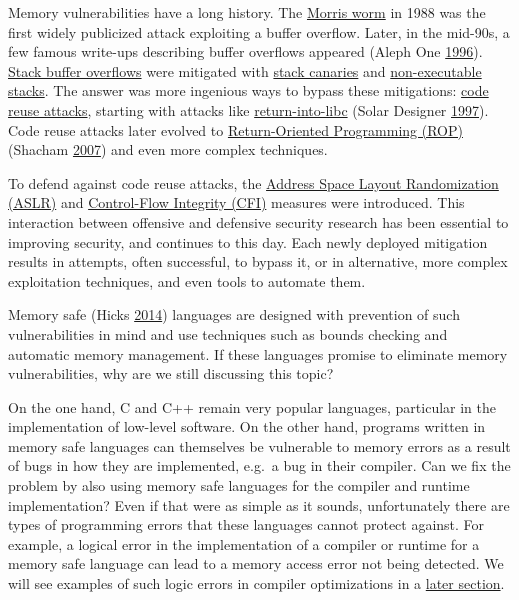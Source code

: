 \documentclass[a4paper,]{report}
\begin{document}
Memory vulnerabilities have a long history. The
\href{https://en.wikipedia.org/wiki/Morris_worm}{Morris worm} in 1988
was the first widely publicized attack exploiting a buffer overflow.
Later, in the mid-90s, a few famous write-ups describing buffer
overflows appeared (Aleph One
\protect\hyperlink{ref-AlephOne1996}{1996}).
\protect\hyperlink{stack-buffer-overflows}{Stack buffer overflows} were
mitigated with \protect\hyperlink{stack-buffer-overflows}{stack
canaries} and \protect\hyperlink{stack-buffer-overflows}{non-executable
stacks}. The answer was more ingenious ways to bypass these mitigations:
\protect\hyperlink{code-reuse-attacks}{code reuse attacks}, starting
with attacks like
\protect\hyperlink{code-reuse-attacks}{return-into-libc} (Solar Designer
\protect\hyperlink{ref-Solar1997}{1997}). Code reuse attacks later
evolved to
\protect\hyperlink{return-oriented-programming}{Return-Oriented
Programming (ROP)} (Shacham \protect\hyperlink{ref-Shacham2007}{2007})
and even more complex techniques.

To defend against code reuse attacks, the
\protect\hyperlink{aslr}{Address Space Layout Randomization (ASLR)} and
\protect\hyperlink{cfi}{Control-Flow Integrity (CFI)} measures were
introduced. This interaction between offensive and defensive security
research has been essential to improving security, and continues to this
day. Each newly deployed mitigation results in attempts, often
successful, to bypass it, or in alternative, more complex exploitation
techniques, and even tools to automate them.

Memory safe (Hicks \protect\hyperlink{ref-Hicks2014}{2014}) languages
are designed with prevention of such vulnerabilities in mind and use
techniques such as bounds checking and automatic memory management. If
these languages promise to eliminate memory vulnerabilities, why are we
still discussing this topic?

On the one hand, C and C++  remain very popular
languages, particular in the implementation of low-level software. On
the other hand, programs written in memory safe languages can themselves
be vulnerable to memory errors as a result of bugs in how they are
implemented, e.g.~a bug in their compiler. Can we fix the problem by
also using memory safe languages for the compiler and runtime
implementation? Even if that were as simple as it sounds, unfortunately
there are types of programming errors that these languages cannot
protect against. For example, a logical error in the implementation of a
compiler or runtime for a memory safe language can lead to a memory
access error not being detected. We will see examples of such logic
errors in compiler optimizations in a
\protect\hyperlink{jit-compiler-vulnerabilities}{later section}.
\end{document}
